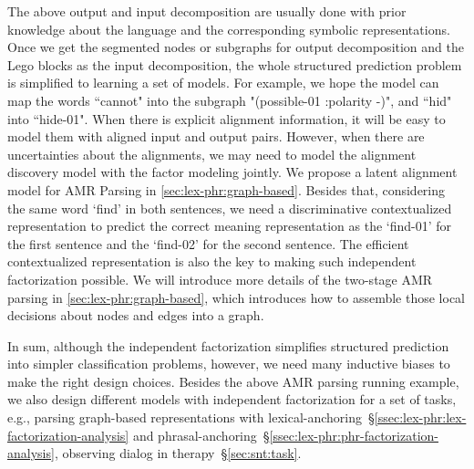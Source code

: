 { The above output and input decomposition
are usually done with prior knowledge about the language and the
corresponding symbolic representations. Once we get the segmented
nodes or subgraphs for output decomposition and the Lego blocks as the
input decomposition, the whole structured prediction problem is
simplified to learning a set of models. For example, we hope the model
can map the words ``cannot" into the subgraph "(possible-01 :polarity
-)", and ``hid" into ``hide-01". When there is explicit alignment
information, it will be easy to model them with aligned input and
output pairs. However, when there are uncertainties about the
alignments, we may need to model the alignment discovery model with
the factor modeling jointly. We propose a latent alignment model for
AMR Parsing in \autoref{sec:lex-phr:graph-based}. Besides that,
considering the same word `find' in both sentences, we need a
discriminative contextualized representation to predict the correct
meaning representation as the `find-01' for the first sentence and the
`find-02' for the second sentence. The efficient contextualized
representation is also the key to making such independent
factorization possible. We will introduce more details of the
two-stage AMR parsing in \autoref{sec:lex-phr:graph-based}, which
introduces how to assemble those local decisions about nodes and edges
into a graph.

In sum, although the independent factorization simplifies structured
prediction into simpler classification problems, however, we need many
inductive biases to make the right design choices. Besides the
above AMR parsing running example, we also design different models with
independent factorization for a set of tasks, e.g., parsing graph-based
representations with
lexical-anchoring~\S\ref{ssec:lex-phr:lex-factorization-analysis} and
phrasal-anchoring~\S\ref{ssec:lex-phr:phr-factorization-analysis},
observing dialog in therapy~\S\ref{sec:snt:task}.

}
